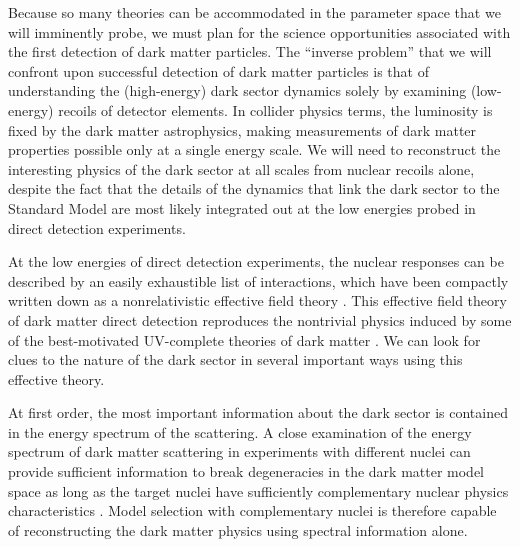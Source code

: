\documentclass[11pt]{article}
\begin{document}
Because so many theories can be accommodated in the parameter space that we will imminently probe, we must plan for the science opportunities associated with the first detection of dark matter particles. The ``inverse problem'' that we will confront upon successful detection of dark matter particles is that of understanding the (high-energy) dark sector dynamics solely by examining (low-energy) recoils of detector elements. In collider physics terms, the luminosity is fixed by the dark matter astrophysics, making measurements of dark matter properties possible only at a single energy scale. We will need to reconstruct the interesting physics of the dark sector at all scales from nuclear recoils alone, despite the fact that the details of the dynamics that link the dark sector to the Standard Model are most likely integrated out at the low energies probed in direct detection experiments.

At the low energies of direct detection experiments, the nuclear responses can be described by an easily exhaustible list of interactions, which have been compactly written down as a nonrelativistic effective field theory \cite{Fitzpatrick:2012ix,Anand:2013yka}. This effective field theory of dark matter direct detection reproduces the nontrivial physics induced by some of the best-motivated UV-complete theories of dark matter \cite{Gresham:2014vja,Gluscevic:2015sqa}. We can look for clues to the nature of the dark sector in several important ways using this effective theory.

At first order, the most important information about the dark sector is contained in the energy spectrum of the scattering. A close examination of the energy spectrum of dark matter scattering in experiments with different nuclei can provide sufficient information to break degeneracies in the dark matter model space as long as the target nuclei have sufficiently complementary nuclear physics characteristics \cite{McDermott:2011hx,Peter:2013aha,Gluscevic:2014vga,Catena:2014epa,Catena:2014hla,Dent:2015zpa,Gluscevic:2015sqa}. Model selection with complementary nuclei is therefore capable of reconstructing the dark matter physics using spectral information alone.
\end{document}
